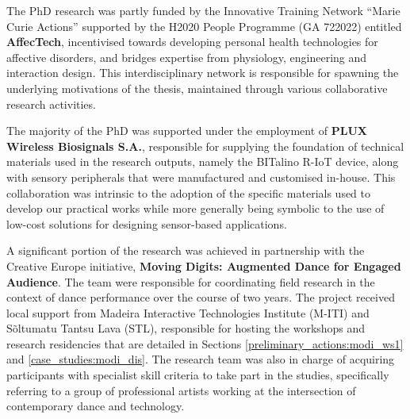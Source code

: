     
        The PhD research was partly funded by the Innovative Training Network “Marie Curie Actions” supported by the H2020 People Programme (GA 722022) entitled \textbf{AffecTech}, incentivised towards developing personal health technologies for affective disorders, and bridges expertise from physiology, engineering and interaction design. This interdisciplinary network is responsible for spawning the underlying motivations of the thesis, maintained through various collaborative research activities.     
    
    
        The majority of the PhD was supported under the employment of \textbf{PLUX Wireless Biosignals S.A.}, responsible for supplying the foundation of technical materials used in the research outputs, namely the BITalino R-IoT device, along with sensory peripherals that were manufactured and customised in-house. This collaboration was intrinsic to the adoption of the specific materials used to develop our practical works while more generally being symbolic to the use of low-cost solutions for designing sensor-based applications.
        
    
        A significant portion of the research was achieved in partnership with the Creative Europe initiative, \textbf{Moving Digits: Augmented Dance for Engaged Audience}. The team were responsible for coordinating field research in the context of dance performance over the course of two years. The project received local support from Madeira Interactive Technologies Institute (M-ITI) and Sõltumatu Tantsu Lava (STL), responsible for hosting the workshops and research residencies that are detailed in Sections \ref{preliminary_actions:modi_ws1} and \ref{case_studies:modi_dis}. The research team was also in charge of acquiring participants with specialist skill criteria to take part in the studies, specifically referring to a group of professional artists working at the intersection of contemporary dance and technology.
        
        
